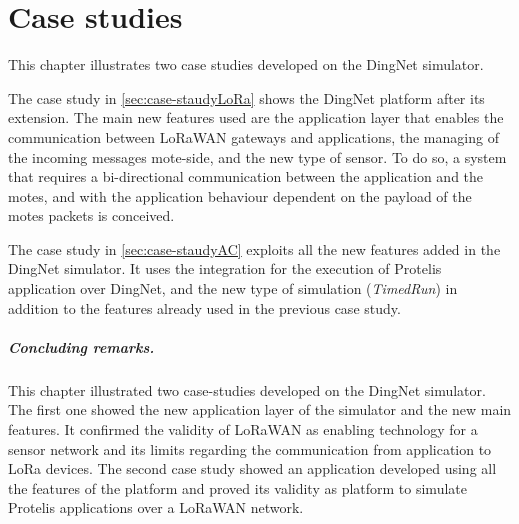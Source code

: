\chapter{Case studies}
\label{chap:case-studies}
This chapter illustrates two case studies developed on the DingNet simulator.

The case study in \cref{sec:case-staudyLoRa} shows the DingNet platform after its extension.
The main new features used are the application layer that enables the communication between LoRaWAN gateways and applications, the managing of the incoming messages mote-side, and the new type of sensor.  
To do so, a system that requires a bi-directional communication between the application and the motes, and with the application behaviour dependent on the payload of the motes packets is conceived.

The case study in \cref{sec:case-staudyAC} exploits all the new features added in the DingNet simulator.
It uses the integration for the execution of Protelis application over DingNet, and the new type of simulation (\textit{TimedRun}) in addition to the features already used in the previous case study.





\paragraph{Concluding remarks.} This chapter illustrated two case-studies developed on the DingNet simulator.
The first one showed the new application layer of the simulator and the new main features. It confirmed the validity of LoRaWAN as enabling technology for a sensor network and its limits regarding the communication from application to LoRa devices.
The second case study showed an application developed using all the features of the platform and proved its validity as platform to simulate Protelis applications over a LoRaWAN network.


